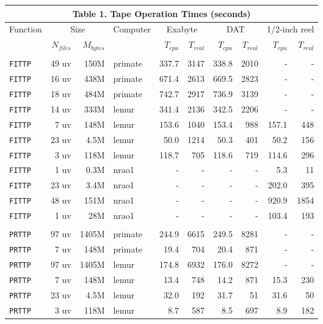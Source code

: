 \vfill\eject
\vfill
\begin{center}
\begin{tabular}{lrrlrrrrrr}
\multicolumn{10}{c}{Table 1. \qquad Tape Operation Times (seconds)}\\
\hline
Function&\multicolumn{2}{c}{Size}&Computer&\multicolumn{2}{c}{Exabyte}&
\multicolumn{2}{c}{DAT}&\multicolumn{2}{c}{1/2-inch reel}\\
 &$N_{files}$&$M_{bytes}$& &$T_{cpu}$&$T_{real}$&$T_{cpu}$&$T_{real}$&
$T_{cpu}$&$T_{real}$\\
\hline
\\
{\tt FITTP} &49 uv&  150M&primate& 337.7& 3147& 338.8& 2010&     -&    -\\
{\tt FITTP} &16 uv&  438M&primate& 671.4& 2613& 669.5& 2823&     -&    -\\
{\tt FITTP} &18 uv&  484M&primate& 742.7& 2917& 736.9& 3139&     -&    -\\
{\tt FITTP} &14 uv&  333M&lemur  & 341.4& 2136& 342.5& 2206&     -&    -\\
{\tt FITTP} & 7 uv&  148M&lemur  & 153.6& 1040& 153.4&  988& 157.1&  448\\
{\tt FITTP} &23 uv&  4.5M&lemur  &  50.0& 1214&  50.3&  401&  50.2&  156\\
{\tt FITTP} & 3 uv&  118M&lemur  & 118.7&  705& 118.6&  719& 114.6&  296\\
{\tt FITTP} & 1 uv&  0.3M&nrao1  &     -&    -&     -&    -&   5.3&   11\\
{\tt FITTP} &23 uv&  3.4M&nrao1  &     -&    -&     -&    -& 202.0&  395\\
{\tt FITTP} &48 uv&  151M&nrao1  &     -&    -&     -&    -& 920.9& 1854\\
{\tt FITTP} & 1 uv&   28M&nrao1  &     -&    -&     -&    -& 103.4&  193\\
\\
{\tt PRTTP} &97 uv& 1405M&primate& 244.9& 6615& 249.5& 8281&     -&    -\\
{\tt PRTTP} & 7 uv&  148M&primate&  19.4&  704&  20.4&  871&     -&    -\\
{\tt PRTTP} &97 uv& 1405M&lemur  & 174.8& 6932& 176.0& 8272&     -&    -\\
{\tt PRTTP} & 7 uv&  148M&lemur  &  13.4&  748&  14.2&  871&  15.3&  230\\
{\tt PRTTP} &23 uv&  4.5M&lemur  &  32.0&  192&  31.7&   51&  31.6&   50\\
{\tt PRTTP} & 3 uv&  118M&lemur  &   8.7&  587&   8.5&  697&   8.9&  182\\

\end{tabular}
\end{center}
